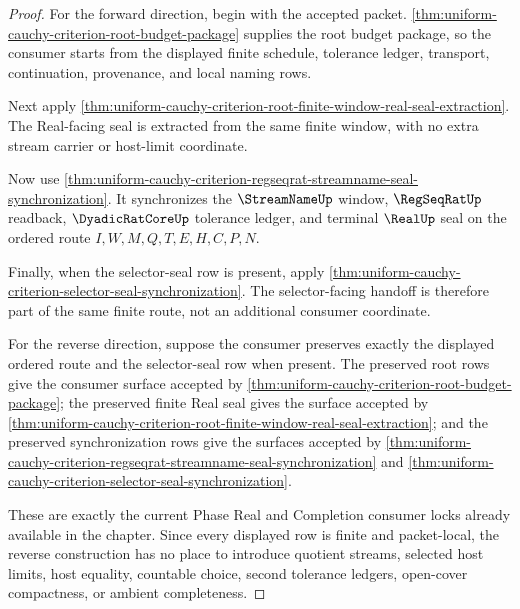 \begin{proof}
For the forward direction, begin with the accepted packet. \autoref{thm:uniform-cauchy-criterion-root-budget-package} supplies the root budget package, so the consumer starts from the displayed finite schedule, tolerance ledger, transport, continuation, provenance, and local naming rows.

Next apply \autoref{thm:uniform-cauchy-criterion-root-finite-window-real-seal-extraction}. The Real-facing seal is extracted from the same finite window, with no extra stream carrier or host-limit coordinate.

Now use \autoref{thm:uniform-cauchy-criterion-regseqrat-streamname-seal-synchronization}. It synchronizes the $\StreamNameUp$ window, $\RegSeqRatUp$ readback, $\DyadicRatCoreUp$ tolerance ledger, and terminal $\RealUp$ seal on the ordered route $I,W,M,Q,T,E,H,C,P,N$.

Finally, when the selector-seal row is present, apply \autoref{thm:uniform-cauchy-criterion-selector-seal-synchronization}. The selector-facing handoff is therefore part of the same finite route, not an additional consumer coordinate.

For the reverse direction, suppose the consumer preserves exactly the displayed ordered route and the selector-seal row when present. The preserved root rows give the consumer surface accepted by \autoref{thm:uniform-cauchy-criterion-root-budget-package}; the preserved finite Real seal gives the surface accepted by \autoref{thm:uniform-cauchy-criterion-root-finite-window-real-seal-extraction}; and the preserved synchronization rows give the surfaces accepted by \autoref{thm:uniform-cauchy-criterion-regseqrat-streamname-seal-synchronization} and \autoref{thm:uniform-cauchy-criterion-selector-seal-synchronization}.

These are exactly the current Phase Real and Completion consumer locks already available in the chapter. Since every displayed row is finite and packet-local, the reverse construction has no place to introduce quotient streams, selected host limits, host equality, countable choice, second tolerance ledgers, open-cover compactness, or ambient completeness.
\end{proof}

